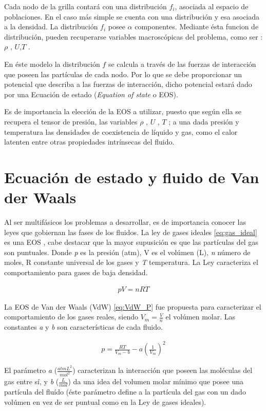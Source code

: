 Cada nodo de la grilla contará con una distribución $f_{i}$, asociada al espacio de poblaciones. En el caso más simple se cuenta con una distribución y esa asociada a la densidad. La distribución $f_{i}$ posee $\alpha$ componentes. Mediante ésta funcion de distribución, pueden recuperarse variables macroscópicas del problema, como ser : $\rho$ , $U$,$T$ .

En éste modelo la distribución $f$ se calcula a través de las fuerzas de interacción que poseen las partículas de cada nodo. Por lo que se debe proporcionar un potencial que describa a las fuerzas de interacción, dicho potencial estará dado por una Ecuación de estado (\textit{Equation of state} o EOS).

Es de importancia la elección de la EOS a utilizar, puesto que según ella se recupera el tensor de presión, las variables $\rho$ , $U$ , $T$ ; a una dada presión y temperatura las densidades de coexistencia de líquido y gas, como el calor latenten entre otras propiedades intrínsecas del fluido.

\section{Ecuación de estado y fluido de Van der Waals}

Al ser multifásicos los problemas a desarrollar, es de importancia conocer las leyes que gobiernan las fases de los fluidos. La ley de gases ideales \ref{eq:gas_ideal} es una EOS , cabe destacar que la mayor supusición es que las partículas del gas son puntuales. Donde \textit{p} es la presión (atm), V es el volúmen (L), \textit{n} número de moles, R constante universal de los gases y \textit{T} temperatura. La Ley caracteriza el comportamiento para gases de baja densidad.

\begin{align}
p V = n R T
\label{eq:gas_ideal}
\end{align}

La EOS de Van der Waals (VdW) \ref{eq:VdW_P} fue propuesta para caracterizar el comportamiento de los gases reales, siendo $V_m = \frac{V}{n}$ el volúmen molar. Las constantes \textit{a} y \textit{b} son características de cada fluido.

\begin{align}
p = \frac{R T}{V_m - b} - a {(\frac{1}{V_m})}^2
\label{eq:VdW_P}
\end{align}

El parámetro \textit{a}  ($\frac{atm L^2}{mol^2}$) caracterizan la interacción que poseen las moléculas del gas entre sí, y \textit{b} ($\frac{L}{mol}$) da una idea del volumen molar mínimo que posee una partícula del fluído (éste parámetro define a la partícula del gas con un dado volúmen en vez de ser puntual como en la Ley de gases ideales).


